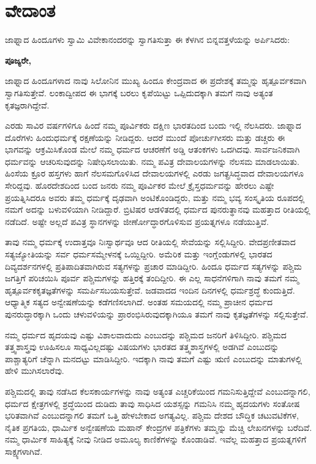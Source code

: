 
\chapter{ವೇದಾಂತ}

ಜಾಫ್ನಾದ ಹಿಂದೂಗಳು ಸ್ವಾಮಿ ವಿವೇಕಾನಂದರನ್ನು ಸ್ವಾಗತಿಸುತ್ತಾ ಈ ಕೆಳಗಿನ ಬಿನ್ನವತ್ತಳೆಯನ್ನು ಅರ್ಪಿಸಿದರು:

\textbf{ಪೂಜ್ಯರೇ, }

ಜಾಫ್ನಾದ ಹಿಂದೂಗಳಾದ ನಾವು ಸಿಲೋನಿನ ಮುಖ್ಯ ಹಿಂದೂ ಕೇಂದ್ರವಾದ ಈ ಪ್ರದೇಶಕ್ಕೆ ತಮ್ಮನ್ನು ಹೃತ್ಪೂರ್ವಕವಾಗಿ ಸ್ವಾಗತಿಸುತ್ತೇವೆ. ಲಂಕಾದ್ವೀಪದ ಈ ಭಾಗಕ್ಕೆ ಬರಲು ಕೃಪೆಯಿಟ್ಟು ಒಪ್ಪಿದುದಕ್ಕಾಗಿ ತಮಗೆ ನಾವು ಅತ್ಯಂತ ಕೃತಜ್ಞರಾಗಿದ್ದೇವೆ. 

ಎರಡು ಸಾವಿರ ವರ್ಷಗಳಿಗೂ ಹಿಂದೆ ನಮ್ಮ ಪೂರ್ವಿಕರು ದಕ್ಷಿಣ ಭಾರತದಿಂದ ಬಂದು ಇಲ್ಲಿ ನೆಲಸಿದರು. ಜಾಫ್ನಾದ ದೊರೆಗಳು ಹಿಂದುಧರ್ಮಕ್ಕೆ ರಕ್ಷಣೆಯನ್ನು ನೀಡಿದ್ದರು. ಆದರೆ ಮುಂದೆ ಪೋರ್ಚುಗೀಸರು ಮತ್ತು ಡಚ್ಚರು ಈ ಭಾಗವನ್ನು ಆಕ್ರಮಿಸಿಕೊಂಡ ಮೇಲೆ ನಮ್ಮ ಧರ್ಮದ ಆಚರಣೆಗೆ ಅಡ್ಡಿ ಆತಂಕಗಳು ಒದಗಿದವು. ಸಾರ್ವಜನಿಕವಾಗಿ ಧರ್ಮವನ್ನು ಆಚರಿಸುವುದನ್ನು ನಿಷೇಧಿಸಲಾಯಿತು. ನಮ್ಮ ಪವಿತ್ರ ದೇವಾಲಯಗಳನ್ನು ನೆಲಸಮ ಮಾಡಲಾಯಿತು. ಹಿಂಸೆಯ ಕ್ರೂರ ಹಸ್ತಗಳು ಹಾಗೆ ನೆಲಸಮಗೊಳಿಸಿದ ದೇವಾಲಯಗಳಲ್ಲಿ ಎರಡು ಜಗತ್ಪ್ರಸಿದ್ಧವಾದ ದೇವಾಲಯಗಳೂ ಸೇರಿದ್ದವು. ಹೊರದೇಶದಿಂದ ಬಂದ ಜನರು ನಮ್ಮ ಪೂರ್ವಿಕರ ಮೇಲೆ ಕ್ರೈಸ್ತಧರ್ಮವನ್ನು ಹೇರಲು ಎಷ್ಟೇ ಪ್ರಯತ್ನಿಸಿದರೂ ಅವರು ತಮ್ಮ ಧರ್ಮಕ್ಕೆ ದೃಢವಾಗಿ ಅಂಟಿಕೊಂಡಿದ್ದರು, ಮತ್ತು ನಮ್ಮ ಭವ್ಯ ಸಂಸ್ಕೃತಿಯ ರೂಪದಲ್ಲಿ ನಮಗೆ ಅದನ್ನು ಬಳುವಳಿಯಾಗಿ ನೀಡಿದ್ದಾರೆ. ಬ್ರಿಟಿಷರ ಆಡಳಿತದಲ್ಲಿ ಧರ್ಮದ ಪುನರುತ್ಥಾನವು ಮಹತ್ತಾದ ರೀತಿಯಲ್ಲಿ ನಡೆದಿದೆ. ಅಷ್ಟೇ ಅಲ್ಲದೆ ಪವಿತ್ರ ಸ್ಥಾನಗಳನ್ನು ಜೀರ್ಣೋದ್ಧಾರಗೊಳಿಸುವ ಪ್ರಯತ್ನಗಳೂ ನಡೆಯುತ್ತಿವೆ. 

ತಾವು ನಮ್ಮ ಧರ್ಮಕ್ಕೆ ಉದಾತ್ತವೂ ನಿಃಸ್ವಾರ್ಥವೂ ಆದ ರೀತಿಯಲ್ಲಿ ಸೇವೆಯನ್ನು ಸಲ್ಲಿಸಿದ್ದೀರಿ. ವೇದಪ್ರಣೀತವಾದ ಸತ್ಯಜ್ಯೋತಿಯನ್ನು ಸರ್ವ ಧರ್ಮಸಮ್ಮೇಳನಕ್ಕೆ ಒಯ್ದಿದ್ದೀರಿ. ಅಮೆರಿಕ ಮತ್ತು ಇಂಗ್ಲೆಂಡುಗಳಲ್ಲಿ ಭಾರತದ ದಿವ್ಯದರ್ಶನಗಳಲ್ಲಿ ಪ್ರತಿಪಾದಿತವಾಗಿರುವ ಸತ್ಯಗಳನ್ನು ಪ್ರಚಾರ ಮಾಡಿದ್ದೀರಿ. ಹಿಂದೂ ಧರ್ಮದ ಸತ್ಯಗಳನ್ನು ಪಶ್ಚಿಮ ಜಗತ್ತಿಗೆ ಪರಿಚಯಿಸಿ ಪೂರ್ವ ಪಶ್ಚಿಮಗಳನ್ನು ಹತ್ತಿರಕ್ಕೆ ತಂದಿದ್ದೀರಿ. ಈ ಎಲ್ಲ ಸಾಧನೆಗಳಿಗಾಗಿ ನಾವು ತಮಗೆ ನಮ್ಮ ಹೃತ್ಪೂರ್ವಕ\break ಕೃತಜ್ಞತೆಗಳನ್ನು ಸಮರ್ಪಿಸಬಯಸುತ್ತೇವೆ. ಜಡವಾದದ ಇಂದಿನ ದಿನಗಳಲ್ಲಿ ಧರ್ಮಶ್ರದ್ಧೆ ಕುಂದುತ್ತಿದೆ. ಆಧ್ಯಾತ್ಮಿಕ ಸತ್ಯದ ಅನ್ವೇಷಣೆಯನ್ನು ಕಡೆಗಣಿಸ\-ಲಾಗಿದೆ. ಅಂತಹ ಸಮಯದಲ್ಲಿ ನಮ್ಮ ಪ್ರಾಚೀನ ಧರ್ಮದ ಪುನರುದ್ಧಾರಕ್ಕಾಗಿ ಒಂದು ಚಳುವಳಿಯನ್ನು ಪ್ರಾರಂಭಿಸಿರುವುದಕ್ಕಾಗಿಯೂ ತಮಗೆ ನಾವು ಕೃತಜ್ಞತೆಗಳನ್ನು ಸಲ್ಲಿಸುತ್ತೇವೆ. 

ನಮ್ಮ ಧರ್ಮದ ಹೃದಯವು ಎಷ್ಟು ವಿಶಾಲವಾದುದು ಎಂಬುದನ್ನು ಪಶ್ಚಿಮದ ಜನರಿಗೆ ತಿಳಿಸಿದ್ದೀರಿ. ಪಶ್ಚಿಮದ ತತ್ತ್ವಶಾಸ್ತ್ರವು ಊಹಿಸಲೂ ಸಾಧ್ಯವಿಲ್ಲದಷ್ಟು ವಿಷಯಗಳು ಭಾರತದ ತತ್ತ್ವಶಾಸ್ತ್ರಗಳಲ್ಲಿ ಅಡಗಿವೆ ಎಂಬುದನ್ನು ಪಾಶ್ಚಾತ್ಯರಿಗೆ ಚೆನ್ನಾಗಿ ಮನದಟ್ಟು ಮಾಡಿಸಿದ್ದೀರಿ. ಇದಕ್ಕಾಗಿ ನಾವು ತಮಗೆ ಎಷ್ಟು ಋಣಿ ಎಂಬುದನ್ನು ಮಾತುಗಳಲ್ಲಿ ಹೇಳಿ ಮುಗಿಸಲಾರೆವು. 

ಪಶ್ಚಿಮದಲ್ಲಿ ತಾವು ನಡೆಸಿದ ಕೆಲಸಕಾರ್ಯಗಳನ್ನು ನಾವು ಅತ್ಯಂತ ಎಚ್ಚರಿಕೆಯಿಂದ ಗಮನಿಸುತ್ತಿದ್ದೇವೆ ಎಂಬುದನ್ನಾಗಲಿ, ಧರ್ಮದ ಕ್ಷೇತ್ರಗಳಲ್ಲಿ ಶ್ರದ್ಧೆಯಿಂದ ದುಡಿದು ತಾವು ಸಾಧಿಸಿದ ಯಶಸ್ಸನ್ನು ಗಮನಿಸಿ ನಮ್ಮ ಹೃದಯಗಳು ಸಂತೋಷ ಭರಿತವಾಗಿವೆ ಎಂಬುದನ್ನಾಗಲಿ ತಮಗೆ ಒತ್ತಿ ಹೇಳಬೇಕಾದ ಅಗತ್ಯವಿಲ್ಲ. ಪಶ್ಚಿಮ ದೇಶದ ಬೌದ್ಧಿಕ ಚಟುವಟಿಕೆಗಳ, ನೈತಿಕ ಪ್ರಗತಿಯ, ಧಾರ್ಮಿಕ ಅನ್ವೇಷಣೆಯ ಮಹಾನ್​ ಕೇಂದ್ರಗಳ ಪತ್ರಿಕೆಗಳು ತಮ್ಮನ್ನು ಮೆಚ್ಚಿ ಲೇಖನಗಳನ್ನು ಬರೆದಿವೆ. ನಮ್ಮ ಧಾರ್ಮಿಕ ಸಾಹಿತ್ಯಕ್ಕೆ ನೀವು ನೀಡಿದ ಅಮೂಲ್ಯ ಕಾಣಿಕೆಗಳನ್ನು ಕೊಂಡಾಡಿವೆ. ಇವೆಲ್ಲ ಮಹತ್ತಾದ ಪ್ರಯತ್ನಗಳಿಗೆ ಸಾಕ್ಷ್ಯಗಳಾಗಿವೆ. 

